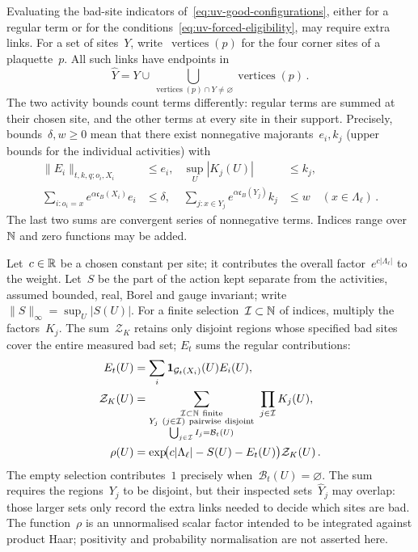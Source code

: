 Evaluating the bad-site indicators of~\eqref{eq:uv-good-configurations}, either for a regular term or for the conditions~\eqref{eq:uv-forced-eligibility}, may require extra links.
For a set of sites~$Y$, write~$\operatorname{vertices}(p)$ for the four corner sites of a plaquette~$p$.
All such links have endpoints in
\begin{equation}\label{eq:uv-inspected-support}
 \widehat Y=Y\cup\bigcup_{\operatorname{vertices}(p)\cap Y\ne\varnothing}
                 \operatorname{vertices}(p)\,.
\end{equation}
The two activity bounds count terms differently: regular terms are summed at their chosen site, and the other terms at every site in their support.
Precisely, bounds~$\delta,w\ge0$ mean that there exist nonnegative majorants~$e_i,k_j$ (upper bounds for the individual activities) with
\begin{equation}\label{eq:uv-activity-bounds}
 \begin{aligned}
 \|E_i\|_{t,k,q;o_i,X_i}&\le e_i,& \sup_U|K_j(U)|&\le k_j,\\
 \sum_{i:o_i=x}e^{\alpha\mathfrak c_B(X_i)}e_i&\le\delta,&
 \sum_{j:x\in Y_j}e^{\alpha\mathfrak c_B(Y_j)}k_j&\le w
 \quad(x\in\Lambda_\ell)\,.
 \end{aligned}
\end{equation}
The last two sums are convergent series of nonnegative terms.
Indices range over~$\mathbb N$ and zero functions may be added.

Let~$c\in\mathbb R$ be a chosen constant per site; it contributes the overall factor~$e^{c|\Lambda_\ell|}$ to the weight. Let~$S$ be the part of the action kept separate from the activities, assumed bounded, real, Borel and gauge invariant; write~$\|S\|_\infty=\sup_U|S(U)|$.
For a finite selection~$\mathcal I\subset\mathbb N$ of indices, multiply the factors~$K_j$.
The sum~$\mathcal Z_K$ retains only disjoint regions whose specified bad sites cover the entire measured bad set; $E_t$ sums the regular contributions:
\begin{equation}\label{eq:uv-activity-weight}
 \begin{aligned}
 E_t(U)&=\sum_i\mathbf1_{\mathcal G_t(X_i)}(U)E_i(U),\\
 \mathcal Z_K(U)&=\sum_{\substack{\mathcal I\subset\N\ \mathrm{finite}\\
              Y_j\ (j\in\mathcal I)\ \mathrm{pairwise\ disjoint}\\
              \bigcup_{j\in\mathcal I}I_j=\mathcal B_t(U)}}\ \prod_{j\in\mathcal I}K_j(U),\\
 \rho(U)&=\exp\!\bigl(c|\Lambda_\ell|-S(U)-E_t(U)\bigr)\mathcal Z_K(U)\,.
 \end{aligned}
\end{equation}
The empty selection contributes~$1$ precisely when~$\mathcal B_t(U)=\varnothing$.
The sum requires the regions~$Y_j$ to be disjoint, but their inspected sets~$\widehat Y_j$ may overlap: those larger sets only record the extra links needed to decide which sites are bad.
The function~$\rho$ is an unnormalised scalar factor intended to be integrated against product Haar; positivity and probability normalisation are not asserted here.

